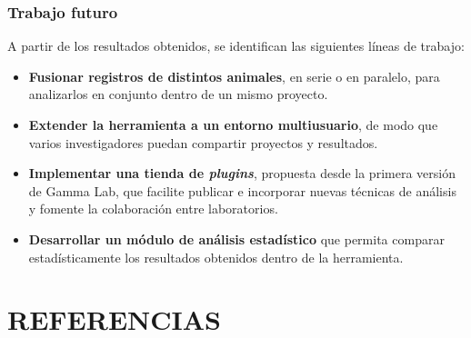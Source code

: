 \documentclass[12pt,letterpaper,oneside]{article}
\newcommand{\capitulo}[1]{\clearpage\section{#1}}
\begin{document}
\subsubsection{Trabajo futuro}

A partir de los resultados obtenidos, se identifican las siguientes líneas de trabajo:

\begin{itemize}
  \item \textbf{Fusionar registros de distintos animales}, en serie o en paralelo, para analizarlos en conjunto dentro de un mismo proyecto.
  \item \textbf{Extender la herramienta a un entorno multiusuario}, de modo que varios investigadores puedan compartir proyectos y resultados.
  \item \textbf{Implementar una tienda de \textit{plugins}}, propuesta desde la primera versión de Gamma Lab, que facilite publicar e incorporar nuevas técnicas de análisis y fomente la colaboración entre laboratorios.
  \item \textbf{Desarrollar un módulo de análisis estadístico} que permita comparar estadísticamente los resultados obtenidos dentro de la herramienta.
\end{itemize}

\capitulo{REFERENCIAS}
\end{document}
